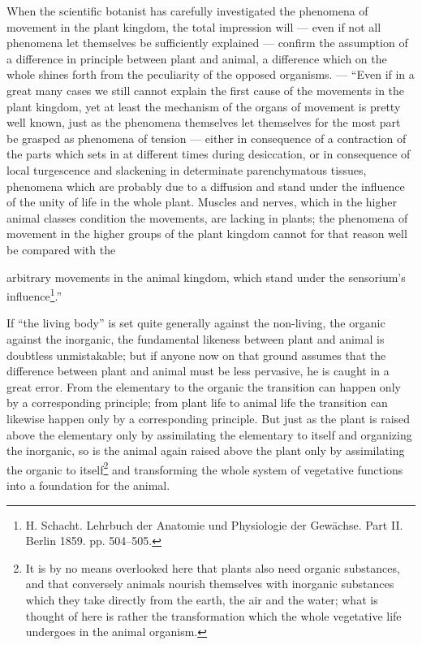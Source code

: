 \documentclass[12pt,a4paper]{book}
\begin{document}
When the scientific botanist has carefully investigated the phenomena of movement
in the plant kingdom, the total impression will --- even if not all phenomena let
themselves be sufficiently explained --- confirm the assumption of a difference in
principle between plant and animal, a difference which on the whole shines forth
from the peculiarity of the opposed organisms. --- ``Even if in a great many cases
we still cannot explain the first cause of the movements in the plant kingdom, yet
at least the mechanism of the organs of movement is pretty well known, just as the
phenomena themselves let themselves for the most part be grasped as phenomena of
tension --- either in consequence of a contraction of the parts which sets in at
different times during desiccation, or in consequence of local turgescence and
slackening in determinate parenchymatous tissues, phenomena which are probably due
to a diffusion and stand under the influence of the unity of life in the whole
plant. Muscles and nerves, which in the higher animal classes condition the
movements, are lacking in plants; the phenomena of movement in the higher groups of
the plant kingdom cannot for that reason well be compared with the

\setcounter{footnote}{0}
arbitrary movements in the animal kingdom, which stand under the sensorium's
influence\footnote{H. Schacht. Lehrbuch der Anatomie und Physiologie der Gewächse.
Part II. Berlin 1859. pp. 504--505.}.''

If ``the living body'' is set quite generally against the non-living, the organic
against the inorganic, the fundamental likeness between plant and animal is
doubtless unmistakable; but if anyone now on that ground assumes that the
difference between plant and animal must be less pervasive, he is caught in a great
error. From the elementary to the organic the transition can happen only by a
corresponding principle; from plant life to animal life the transition can likewise
happen only by a corresponding principle. But just as the plant is raised above the
elementary only by assimilating the elementary to itself and organizing the
inorganic, so is the animal again raised above the plant only by assimilating the
organic to itself\footnote{It is by no means overlooked here that plants also need
organic substances, and that conversely animals nourish themselves with inorganic
substances which they take directly from the earth, the air and the water; what is
thought of here is rather the transformation which the whole vegetative life
undergoes in the animal organism.} and transforming the whole system of vegetative
functions into a foundation for the animal.
\end{document}
